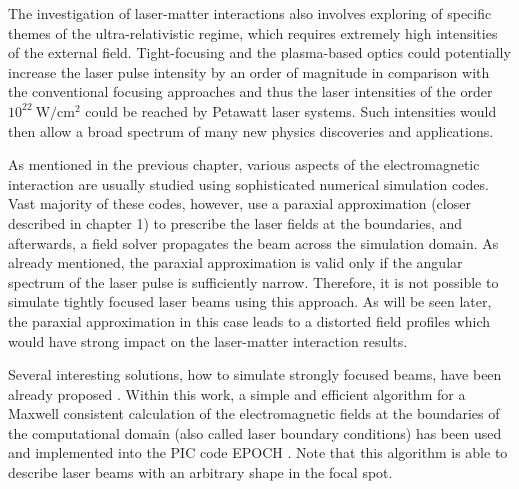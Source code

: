 The investigation of laser-matter interactions also involves exploring of specific themes of the ultra-relativistic regime, which requires extremely high intensities of the external field. Tight-focusing and the plasma-based optics could potentially increase the laser pulse intensity by an order of magnitude in comparison with the conventional focusing approaches and thus the laser intensities of the order $ 10^{22} \ \mathrm{W/cm^2} $ could be reached by Petawatt laser systems. Such intensities would then allow a broad spectrum of many new physics discoveries and applications.

As mentioned in the previous chapter, various aspects of the electromagnetic interaction are usually studied using sophisticated numerical simulation codes. Vast majority of these codes, however, use a paraxial approximation (closer described in chapter 1) to prescribe the laser fields at the boundaries, and afterwards, a field solver propagates the beam across the simulation domain. As already mentioned, the paraxial approximation is valid only if the angular spectrum of the laser pulse is sufficiently narrow. Therefore, it is not possible to simulate tightly focused laser beams using this approach. As will be seen later, the paraxial approximation in this case leads to a distorted field profiles which would have strong impact on the laser-matter interaction results.

Several interesting solutions, how to simulate strongly focused beams, have been already proposed \cite{Sepke2006, Fedorov2016, Wang2002, Sepke22006, Agrawal1979, Hua2004, Hora1990, Couairon2015, Moloney2012, Sheppard1999}. Within this work, a simple and efficient algorithm for a Maxwell consistent calculation of the electromagnetic fields at the boundaries of the computational domain \cite{Thiele2016} (also called laser boundary conditions) has been used and implemented into the PIC code EPOCH \cite{bennett}. Note that this algorithm is able to describe laser beams with an arbitrary shape in the focal spot.